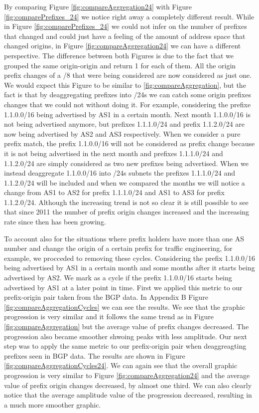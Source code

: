 \documentclass[11pt,a4paper]{scrreprt}
\begin{document}
By comparing Figure \ref{fig:compareAggregation24} with Figure \ref{fig:comparePrefixes_24} we notice right away a completely different result. While in Figure \ref{fig:comparePrefixes_24} we could not infer on the number of prefixes that changed and could just have a feeling of the amount of address space that changed origins, in Figure \ref{fig:compareAggregation24} we can have a different perspective. 
The difference between both Figures is due to the fact that we grouped the same origin-origin and return 1 for each of them. All the origin prefix changes of a /8 that were being considered are now considered as just one. 
We would expect this Figure to be similar to \ref{fig:compareAggregation}, but the fact is that by deaggregating prefixes into /24s we can catch some origin prefixes changes that we could not without doing it. 
For example, considering the prefixe 1.1.0.0/16 being advertised by AS1 in a certain month. Next month 1.1.0.0/16 is not being advertised anymore, but prefixes 1.1.1.0/24 and prefix 1.1.2.0/24 are now being advertised by AS2 and AS3 respectively. When we consider a pure prefix match, the prefix 1.1.0.0/16 will not be considered as prefix change because it is not being advertised in the next month and prefixes 1.1.1.0/24 and 1.1.2.0/24 are simply considered as two new prefixes being advertised. When we instead deaggregate 1.1.0.0/16 into /24s subnets the prefixes 1.1.1.0/24 and 1.1.2.0/24 will be included and when we compared the months we will notice a change from AS1 to AS2 for prefix 1.1.1.0/24 and AS1 to AS3 for prefix 1.1.2.0/24. 
Although the increasing trend is not so clear it is still possible to see that since 2011 the number of prefix origin changes increased and the increasing rate since then has been growing.

To account also for the situations where prefix holders have more than one AS number and change the origin of a certain prefix for traffic engineering, for example, we procceded to removing these cycles. Considering the prefix 1.1.0.0/16 being advertised by AS1 in a certain month and some months after it starts being advertised by AS2. We mark as a cycle if the prefix 1.1.0.0/16 starts being advertised by AS1 at a later point in time.  
First we applied this metric to our prefix-origin pair taken from the BGP data. In Appendix B Figure \ref{fig:compareAggregationCycles} we can see the results.
We see that the graphic progression is very similar and it follows the same trend as in Figure \ref{fig:compareAggregation} but the average value of prefix changes decreased. The progression also became smoother shwoing peaks with less amplitude. 
Our next step was to apply the same metric to our prefix-origin pair when deaggreagting prefixes seen in BGP data. The results are shown in Figure \ref{fig:compareAggregationCycles24}. We can again see that the overall graphic progression is very similar to Figure \ref{fig:compareAggregation24} and the average value of prefix origin changes decreased, by almost one third. We can also clearly notice that the average amplitude value of the progression decreased, resulting in a much more smoother graphic.
\end{document}
